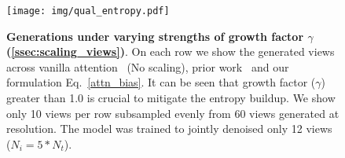 \begin{figure}[h!]
    \centering    
    \hspace{-0.5cm}
    \texttt{[image: img/qual\_entropy.pdf]}
    \vspace{-0.2cm}
    \caption{{\textbf{Generations under varying strengths of growth factor $\gamma$ (\cref{ssec:scaling_views})}. On each row we show the generated views across vanilla attention~\cite{vaswani2017attention} (No scaling), prior work~\cite{jin2023training} and our formulation Eq.~\eqref{attn_bias}. It can be seen that growth factor ($\gamma$) greater than 1.0 is crucial to mitigate the entropy buildup. We show only 10 views per row subsampled evenly from 60 views generated at \resthree resolution. The model was trained to jointly denoised only 12 views ($N_i = 5*N_t$).}}
    \label{fig:qual_entropy}
\end{figure}

